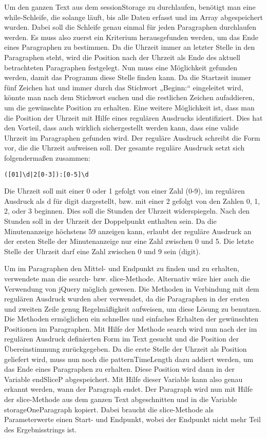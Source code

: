 {Um den ganzen Text aus dem sessionStorage zu durchlaufen, benötigt man eine while-Schleife, die solange läuft, bis alle Daten erfasst und im Array abgespeichert wurden. Dabei soll die Schleife genau einmal für jeden Paragraphen durchlaufen werden. Es muss also zuerst ein Kriterium herausgefunden werden, um das Ende eines Paragraphen zu bestimmen. Da die Uhrzeit immer an letzter Stelle in den Paragraphen steht, wird die Position nach der Uhrzeit als Ende des aktuell betrachteten Paragraphen festgelegt. Nun muss eine Möglichkeit gefunden werden, damit das Programm diese Stelle finden kann. Da die Startzeit immer fünf Zeichen hat und immer durch das Stichwort „Beginn:“ eingeleitet wird, könnte man nach dem Stichwort suchen und die restlichen Zeichen aufaddieren, um die gewünschte Position zu erhalten. Eine weitere Möglichkeit ist, dass man die Position der Uhrzeit mit Hilfe eines regulären Ausdrucks identifiziert. Dies hat den Vorteil, dass auch wirklich sichergestellt werden kann, dass eine valide Uhrzeit im Paragraphen gefunden wird. Der reguläre Ausdruck schreibt die Form vor, die die Uhrzeit aufweisen soll. Der gesamte reguläre Ausdruck setzt sich folgendermaßen zusammen:
\begin{verbatim}
([01]\d|2[0-3]):[0-5]\d
\end{verbatim}
Die Uhrzeit soll mit einer 0 oder 1 gefolgt von einer Zahl (0-9), im regulären Ausdruck als d für digit dargestellt, bzw. mit einer 2 gefolgt von den Zahlen 0, 1, 2, oder 3 beginnen. Dies soll die Stunden der Uhrzeit widerspiegeln. Nach den Stunden soll in der Uhrzeit der Doppelpunkt enthalten sein. Da die Minutenanzeige höchstens 59 anzeigen kann, erlaubt der reguläre Ausdruck an der ersten Stelle der Minutenanzeige nur eine Zahl zwischen 0 und 5. Die letzte Stelle der Uhrzeit darf eine Zahl zwischen 0 und 9 sein (digit). 

Um im Paragraphen den Mittel- und Endpunkt zu finden und zu erhalten, verwendete man die search- bzw. slice-Methode. Alternativ wäre hier auch die Verwendung von jQuery möglich gewesen. Die Methoden in Verbindung mit dem regulären Ausdruck wurden aber verwendet, da die Paragraphen in der ersten und zweiten Zeile genug Regelmäßigkeit aufweisen, um diese Lösung zu benutzen. Die Methoden ermöglichen ein schnelles und einfaches Erhalten der gewünschten Positionen im Paragraphen.
Mit Hilfe der Methode search wird nun nach der im regulären Ausdruck definierten Form im Text gesucht und die Position der Übereinstimmung zurückgegeben. Da die erste Stelle der Uhrzeit als Position geliefert wird, muss nun noch die patternTimeLength dazu addiert werden, um das Ende eines Paragraphen zu erhalten. Diese Position wird dann in der Variable endSliceP abgespeichert. Mit Hilfe dieser Variable kann also genau erkannt werden, wann der Paragraph endet. Der Paragraph wird nun mit Hilfe der slice-Methode aus dem ganzen Text abgeschnitten und in die Variable storageOneParagraph kopiert. Dabei braucht die slice-Methode als Parameterwerte einen Start- und Endpunkt, wobei der Endpunkt nicht mehr Teil des Ergebnisstrings ist. 

}
